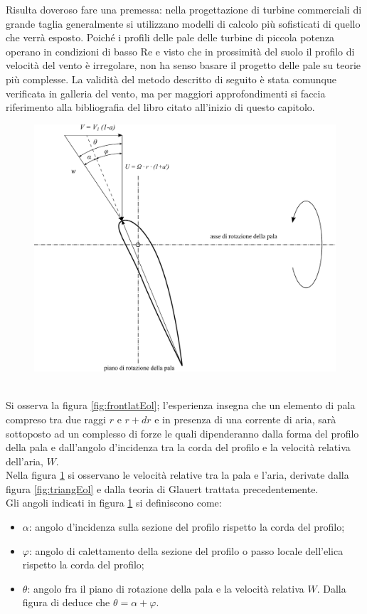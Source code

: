 Risulta doveroso fare una premessa: nella progettazione di turbine commerciali di grande taglia generalmente si utilizzano modelli di calcolo più sofisticati di quello che verrà esposto.
Poiché i profili delle pale delle turbine di piccola potenza operano in condizioni di basso Re e visto che in prossimità del suolo il profilo di velocità del vento è irregolare, non ha senso basare il progetto delle pale su teorie più complesse. 
La validità del metodo descritto di seguito è stata comunque verificata in galleria del vento, ma per maggiori approfondimenti si faccia riferimento alla bibliografia del libro citato all'inizio di questo capitolo. 
\begin{figure}[h!]
\centering
  \includegraphics[width=.7\textwidth]{fig/triangEol2.pdf}
\caption{}
\label{fig:triangEol2}
\end{figure}
\\Si osserva la figura \ref{fig:frontlatEol}; l'esperienza insegna che un elemento di pala compreso tra due raggi $r$ e $r+dr$ e in presenza di una corrente di aria, sarà sottoposto ad un complesso di forze le quali dipenderanno dalla forma del profilo della pala e dall'angolo d'incidenza tra la corda del profilo e la velocità relativa dell'aria, $W$. \\
Nella figura \ref{fig:triangEol2} si osservano le velocità relative tra la pala e l'aria, derivate dalla figura \ref{fig:triangEol} e dalla teoria di Glauert trattata precedentemente. \\
Gli angoli indicati in figura \ref{fig:triangEol2} si definiscono come:
\begin{itemize}
	\item $\alpha$: angolo d'incidenza sulla sezione del profilo rispetto la corda del profilo;
	\item $\varphi$: angolo di calettamento della sezione del profilo o passo locale dell'elica rispetto la corda del profilo;
	\item $\theta$: angolo fra il piano di rotazione della pala e la velocità relativa $W$. Dalla figura di deduce che $\theta = \alpha + \varphi$.
\end{itemize}
